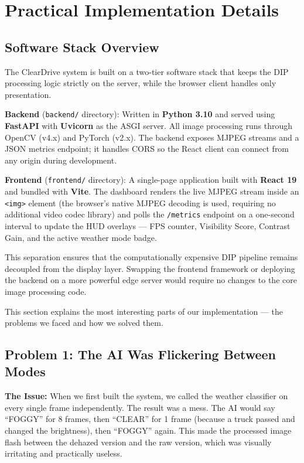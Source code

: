 \documentclass[12pt, a4paper]{article}
\begin{document}
\section{Practical Implementation Details}

\subsection{Software Stack Overview}

The ClearDrive system is built on a two-tier software stack that keeps the DIP
processing logic strictly on the server, while the browser client handles only
presentation.

\textbf{Backend} (\texttt{backend/} directory): Written in \textbf{Python 3.10}
and served using \textbf{FastAPI} with \textbf{Uvicorn} as the ASGI server.
All image processing runs through OpenCV (v4.x) and PyTorch (v2.x). The backend
exposes MJPEG streams and a JSON metrics endpoint; it handles CORS so the React
client can connect from any origin during development.

\textbf{Frontend} (\texttt{frontend/} directory): A single-page application
built with \textbf{React 19} and bundled with \textbf{Vite}. The dashboard
renders the live MJPEG stream inside an \texttt{<img>} element (the browser's
native MJPEG decoding is used, requiring no additional video codec library) and
polls the \texttt{/metrics} endpoint on a one-second interval to update the
HUD overlays — FPS counter, Visibility Score, Contrast Gain, and the active
weather mode badge.

This separation ensures that the computationally expensive DIP pipeline remains
decoupled from the display layer. Swapping the frontend framework or deploying
the backend on a more powerful edge server would require no changes to the core
image processing code.

This section explains the most interesting parts of our implementation — the
problems we faced and how we solved them.

\subsection{Problem 1: The AI Was Flickering Between Modes}

\textbf{The Issue:} When we first built the system, we called the weather
classifier on every single frame independently. The result was a mess. The AI
would say ``FOGGY'' for 8 frames, then ``CLEAR'' for 1 frame (because a truck
passed and changed the brightness), then ``FOGGY'' again. This made the
processed image flash between the dehazed version and the raw version, which
was visually irritating and practically useless.
\end{document}
